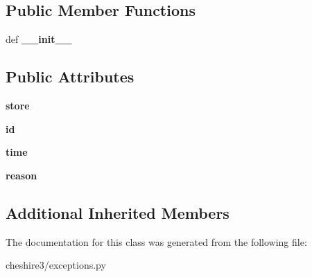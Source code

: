 \subsection*{Public Member Functions}
\begin{DoxyCompactItemize}
\item 
\hypertarget{classcheshire3_1_1exceptions_1_1_object_deleted_exception_af7f9ce5da092be3aeaf709eedd2b7edb}{def {\bfseries \-\_\-\-\_\-init\-\_\-\-\_\-}}\label{classcheshire3_1_1exceptions_1_1_object_deleted_exception_af7f9ce5da092be3aeaf709eedd2b7edb}

\end{DoxyCompactItemize}
\subsection*{Public Attributes}
\begin{DoxyCompactItemize}
\item 
\hypertarget{classcheshire3_1_1exceptions_1_1_object_deleted_exception_a1e575416484b5121e4fa61dfc5eca0b5}{{\bfseries store}}\label{classcheshire3_1_1exceptions_1_1_object_deleted_exception_a1e575416484b5121e4fa61dfc5eca0b5}

\item 
\hypertarget{classcheshire3_1_1exceptions_1_1_object_deleted_exception_a0e8545b616853eb4806af885b61194af}{{\bfseries id}}\label{classcheshire3_1_1exceptions_1_1_object_deleted_exception_a0e8545b616853eb4806af885b61194af}

\item 
\hypertarget{classcheshire3_1_1exceptions_1_1_object_deleted_exception_a94fd6c8ce0fcde7f0491b020c84ed453}{{\bfseries time}}\label{classcheshire3_1_1exceptions_1_1_object_deleted_exception_a94fd6c8ce0fcde7f0491b020c84ed453}

\item 
\hypertarget{classcheshire3_1_1exceptions_1_1_object_deleted_exception_a74a5ddd2d801eddcc0f54a47959b2020}{{\bfseries reason}}\label{classcheshire3_1_1exceptions_1_1_object_deleted_exception_a74a5ddd2d801eddcc0f54a47959b2020}

\end{DoxyCompactItemize}
\subsection*{Additional Inherited Members}


The documentation for this class was generated from the following file\-:\begin{DoxyCompactItemize}
\item 
cheshire3/exceptions.\-py\end{DoxyCompactItemize}
